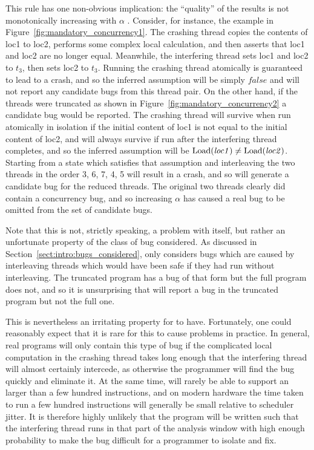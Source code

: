 This rule has one non-obvious implication: the ``quality'' of the
results is not monotonically increasing with $\alpha$
.  Consider, for instance, the example in
Figure~\ref{fig:mandatory_concurrency1}.  The crashing thread copies the contents of loc1 to loc2,
performs some complex local calculation, and then asserts that loc1
and loc2 are no longer equal.  Meanwhile, the interfering thread sets
loc1 and loc2 to $t_3$, then sets loc2 to $t_3$.  Running the crashing
thread atomically is guaranteed to lead to a crash, and so the
inferred assumption will be simply $\mathit{false}$ and {\technique}
will not report any candidate bugs from this thread pair.  On the
other hand, if the threads were truncated as shown in
Figure~\ref{fig:mandatory_concurrency2} a candidate bug would be
reported.  The crashing thread will survive when run atomically in
isolation if the initial content of loc1 is not equal to the initial
content of loc2, and will always survive if run after the interfering
thread completes, and so the inferred assumption will be
$\mathrm{Load}(\mathit{loc1}) \not= \mathrm{Load}(\mathit{loc2})$.  Starting from
a state which satisfies that assumption and interleaving the two
threads in the order 3, 6, 7, 4, 5 will result in a crash, and so
{\technique} will generate a candidate bug for the reduced threads.
The original two threads clearly did contain a concurrency bug, and so
increasing $\alpha$ has caused a real bug to be omitted from the set
of candidate bugs.

Note that this is not, strictly speaking, a problem with {\technique}
itself, but rather an unfortunate property of the class of bug
considered.  As discussed in Section~\ref{sect:intro:bugs_considered},
{\technique} only considers bugs which are caused by interleaving
threads which would have been safe if they had run without
interleaving.  The truncated program has a bug of that form but the
full program does not, and so it is unsurprising that {\technique}
will report a bug in the truncated program but not the full one.

This is nevertheless an irritating property for {\technique} to have.
Fortunately, one could reasonably expect that it is rare for this to
cause problems in practice.  In general, real programs will only
contain this type of bug if the complicated local computation in the
crashing thread takes long enough that the interfering thread will
almost certainly intercede, as otherwise the programmer will find the
bug quickly and eliminate it.  At the same time, {\technique} will
rarely be able to support an  larger than a
few hundred instructions, and on modern hardware the time taken to run
a few hundred instructions will generally be small relative to
scheduler jitter.  It is therefore highly unlikely that the program
will be written such that the interfering thread runs in that part of
the analysis window with high enough probability to make the bug
difficult for a programmer to isolate and fix.  


